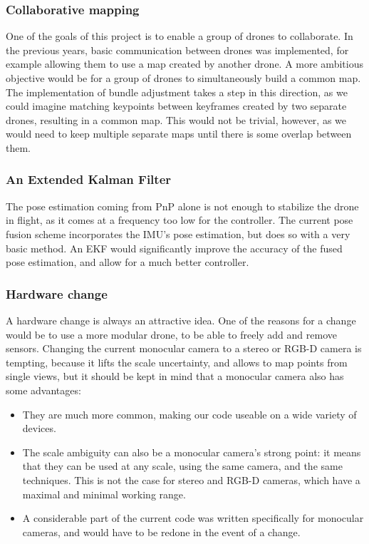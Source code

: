 \subsubsection{Collaborative mapping}
One of the goals of this project is to enable a group of drones to collaborate. In the previous years, basic communication between drones was implemented, for example allowing them to use a map created by another drone. A more ambitious objective would be for a group of drones to simultaneously build a common map. The implementation of bundle adjustment takes a step in this direction, as we could imagine matching keypoints between keyframes created by two separate drones, resulting in a common map. This would not be trivial, however, as we would need to keep multiple separate maps until there is some overlap between them.

\subsubsection{An Extended Kalman Filter}
The pose estimation coming from PnP alone is not enough to stabilize the drone in flight, as it comes at a frequency too low for the controller. The current pose fusion scheme incorporates the IMU's pose estimation, but does so  with a very basic method. An EKF would significantly improve the accuracy of the fused pose estimation, and allow for a much better controller.

\subsubsection{Hardware change}
A hardware change is always an attractive idea. One of the reasons for a change would be to use a more modular drone, to be able to freely add and remove sensors. Changing the current monocular camera to a stereo or RGB-D camera is tempting, because it lifts the scale uncertainty, and allows to map points from single views, but it should be kept in mind that a monocular camera also has some advantages:
\begin{itemize}
\item They are much more common, making our code useable on a wide variety of devices.
\item The scale ambiguity can also be a monocular camera's strong point: it means that they can be used at any scale, using the same camera, and the same techniques. This is not the case for stereo and RGB-D cameras, which have a maximal and minimal working range.
\item A considerable part of the current code was written specifically for monocular cameras, and would have to be redone in the event of a change.
\end{itemize}